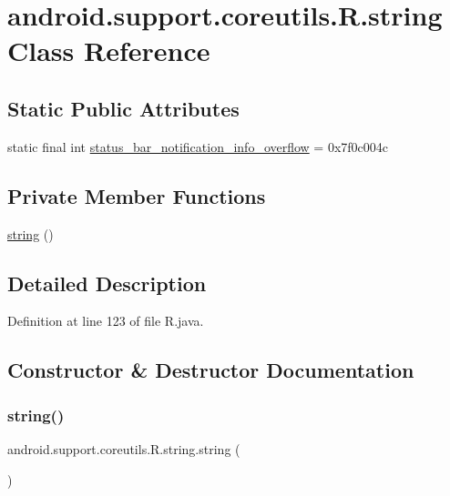 \hypertarget{classandroid_1_1support_1_1coreutils_1_1_r_1_1string}{}\section{android.\+support.\+coreutils.\+R.\+string Class Reference}
\label{classandroid_1_1support_1_1coreutils_1_1_r_1_1string}
\subsection*{Static Public Attributes}
\begin{DoxyCompactItemize}
\item 
static final int \mbox{\hyperlink{classandroid_1_1support_1_1coreutils_1_1_r_1_1string_ac3802014c312560d8974b22579aba880}{status\+\_\+bar\+\_\+notification\+\_\+info\+\_\+overflow}} = 0x7f0c004c
\end{DoxyCompactItemize}
\subsection*{Private Member Functions}
\begin{DoxyCompactItemize}
\item 
\mbox{\hyperlink{classandroid_1_1support_1_1coreutils_1_1_r_1_1string_ad99745d1a77f2f9f13ed8c9dfed636c5}{string}} ()
\end{DoxyCompactItemize}


\subsection{Detailed Description}


Definition at line 123 of file R.\+java.



\subsection{Constructor \& Destructor Documentation}
\mbox{\label{classandroid_1_1support_1_1coreutils_1_1_r_1_1string_ad99745d1a77f2f9f13ed8c9dfed636c5}} 
\subsubsection{\texorpdfstring{string()}{string()}}
{\footnotesize\ttfamily android.\+support.\+coreutils.\+R.\+string.\+string (\begin{DoxyParamCaption}{ }\end{DoxyParamCaption})\hspace{0.3cm}{\ttfamily [private]}}



